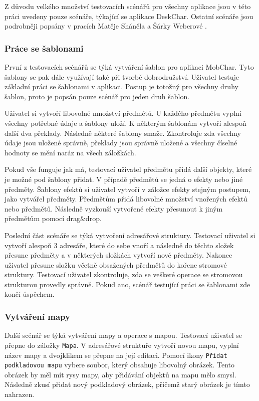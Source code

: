\documentclass[thesis=B,czech]{resources/FITthesis}[2012/06/26]
\begin{document}
Z důvodu velkého množství testovacích scénářů pro všechny aplikace jsou v této práci uvedeny pouze scénáře, týkající se aplikace DeskChar. Ostatní scénáře jsou podrobněji popsány v pracích Matěje Sháněla \cite{Shanel_2017} a Šárky Weberové \cite{Weberova_2017}. 

\subsubsection{Práce se šablonami}
První z testovacích scénářů se týká vytváření šablon pro aplikaci MobChar. Tyto šablony se pak dále využívají také při tvorbě dobrodružství. Uživatel testuje základní práci se šablonami v aplikaci. Postup je totožný pro všechny druhy šablon, proto je popsán pouze scénář pro jeden druh šablon. \par

Uživatel si vytvoří libovolné množství předmětů. U každého předmětu vyplní všechny potřebné údaje a šablony uloží. K některým šablonám vytvoří alespoň další dva překlady. Následně některé šablony smaže. Zkontroluje zda všechny údaje jsou uložené správně, překlady jsou správně uložené a všechny číselné hodnoty se mění naráz na všech záložkách. \par

Pokud vše funguje jak má, testovací uživatel předmětu přidá další objekty, které je možné pod šablony přidat. V případě předmětů se jedná o efekty nebo jiné předměty. Šablony efektů si uživatel vytvoří v záložce efekty stejným postupem, jako vytvářel předměty. Předmětům přidá libovolné množství vnořených efektů nebo předmětů. Následně vyzkouší vytvořené efekty přesunout k jiným předmětům pomocí drag\&drop. \par 

Poslední část scénáře se týká vytvoření adresářové struktury. Testovací uživatel si vytvoří alespoň 3 adresáře, které do sebe vnoří a následně do těchto složek přesune předměty a v některých složkách vytvoří nové předměty. Nakonec uživatel přesune složku včetně obsažených předmětů do kořene stromové struktury. Testovací uživatel zkontroluje, zda se veškeré operace se stromovou strukturou provedly správně. Pokud ano, scénář testující práci se šablonami zde končí úspěchem. 

\subsubsection{Vytváření mapy}
Další scénář se týká vytváření mapy a operace s mapou.  Testovací uživatel se přepne do záložky \texttt{Mapa}. V adresářové struktuře vytvoří novou mapu, vyplní název mapy a dvojklikem se přepne na její editaci. Pomocí ikony \texttt{Přidat podkladovou mapu} vybere soubor, který obsahuje libovolný obrázek. Tento obrázek by měl mít rysy mapy, aby přidávání objektů na mapu mělo smysl. Následně zkusí přidat nový podkladový obrázek, přičemž starý obrázek je tímto nahrazen. \par
\end{document}
